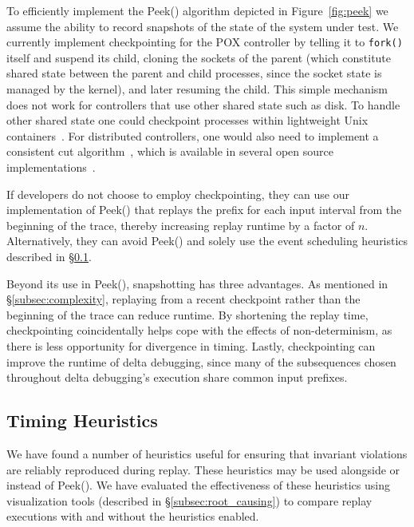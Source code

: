 To efficiently implement the {\sc Peek()} algorithm depicted in
Figure~\ref{fig:peek} we assume the ability to record snapshots of the state of the
system under test. We currently implement checkpointing for the POX
controller by telling it to \verb=fork()= itself and suspend its child,
cloning the sockets of the parent
(which constitute shared state between the parent and child processes,
since the socket state is managed by the kernel),
and later resuming the child. This simple mechanism does
not work for controllers that use other shared state such as disk.
To handle other shared state one could checkpoint processes within
lightweight Unix containers~\cite{lxc}. For distributed controllers, one
would also need to implement a consistent cut
algorithm~\cite{Chandy:1985:DSD:214451.214456}, which is available in several open source
implementations~\cite{ansel2009dmtcp}.

If developers do not choose to employ checkpointing,
they can use our implementation of {\sc Peek()} that replays the prefix for each input
interval from the beginning of the trace, thereby increasing replay runtime by
a factor of $n$. Alternatively, they can
avoid {\sc Peek()} and solely use the event scheduling heuristics described in \S\ref{subsec:timing_heuristics}.

Beyond its use in {\sc Peek()}, snapshotting has three advantages.
As mentioned in \S\ref{subsec:complexity}, replaying from a
recent checkpoint rather than the beginning of the trace can reduce runtime.
By shortening the replay time, checkpointing coincidentally helps cope
with the effects of non-determinism, as there is less opportunity for
divergence in timing. Lastly, checkpointing can improve the runtime of delta
debugging, since many of the subsequences chosen throughout delta debugging's
execution share common input prefixes.

\subsection{Timing Heuristics}
\label{subsec:timing_heuristics}

We have found a number of
heuristics useful for ensuring that invariant violations are reliably reproduced during replay.
These heuristics may be used alongside or instead of {\sc Peek()}. We have evaluated the effectiveness
of these heuristics using visualization tools
(described in \S\ref{subsec:root_causing}) to compare replay executions with and
without the heuristics enabled.

